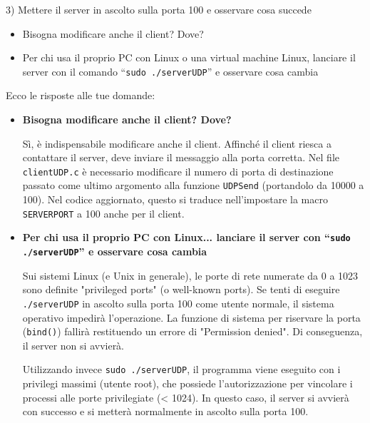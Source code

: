 \documentclass[11pt]{article}
\begin{document}
\begin{tcolorbox}[colback=blue!5!white,colframe=blue!75!black,title=\textbf{DOMANDA}, breakable]
3) Mettere il server in ascolto sulla porta 100 e osservare cosa succede
\begin{itemize}
    \item Bisogna modificare anche il client? Dove?
    \item Per chi usa il proprio PC con Linux o una virtual machine Linux, lanciare il server con il comando ``\texttt{sudo ./serverUDP}'' e osservare cosa cambia
\end{itemize}
\end{tcolorbox}

\begin{tcolorbox}[colback=green!5!white,colframe=green!75!black,title=\textbf{RISPOSTA}, breakable]
Ecco le risposte alle tue domande:

\begin{itemize}
    \item \textbf{Bisogna modificare anche il client? Dove?}
    
    Sì, è indispensabile modificare anche il client. Affinché il client riesca a contattare il server, deve inviare il messaggio alla porta corretta. Nel file \texttt{clientUDP.c} è necessario modificare il numero di porta di destinazione passato come ultimo argomento alla funzione \texttt{UDPSend} (portandolo da 10000 a 100). Nel codice aggiornato, questo si traduce nell'impostare la macro \texttt{SERVERPORT} a 100 anche per il client.
    
    \item \textbf{Per chi usa il proprio PC con Linux... lanciare il server con ``\texttt{sudo ./serverUDP}'' e osservare cosa cambia}
    
    Sui sistemi Linux (e Unix in generale), le porte di rete numerate da 0 a 1023 sono definite "privileged ports" (o well-known ports). Se tenti di eseguire \texttt{./serverUDP} in ascolto sulla porta 100 come utente normale, il sistema operativo impedirà l'operazione. La funzione di sistema per riservare la porta (\texttt{bind()}) fallirà restituendo un errore di "Permission denied". Di conseguenza, il server non si avvierà.
    
    Utilizzando invece \texttt{sudo ./serverUDP}, il programma viene eseguito con i privilegi massimi (utente root), che possiede l'autorizzazione per vincolare i processi alle porte privilegiate (< 1024). In questo caso, il server si avvierà con successo e si metterà normalmente in ascolto sulla porta 100.
\end{itemize}
\end{tcolorbox}
\end{document}
